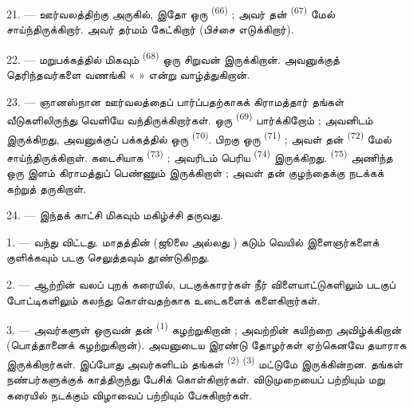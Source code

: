 21. --- ஊர்வலத்திற்கு அருகில், இதோ ஒரு 
\textsuperscript{(66)} ; அவர் தன்  \textsuperscript{(67)}
மேல் சாய்ந்திருக்கிறார். அவர் தர்மம் கேட்கிறார் (பிச்சை எடுக்கிறார்).

22. --- மறுபக்கத்தில் மிகவும்  \textsuperscript{(68)} ஒரு
சிறுவன் இருக்கிறான். அவனுக்குத் தெரிந்தவர்களை வணங்கி «  »
என்று வாழ்த்துகிறான்.

23. --- ஞானஸ்நான ஊர்வலத்தைப் பார்ப்பதற்காகக் கிராமத்தார் தங்கள்
வீடுகளிலிருந்து வெளியே வந்திருக்கிறார்கள். ஒரு 
\textsuperscript{(69)} பார்க்கிறோம் ; அவனிடம் 
இருக்கிறது, அவனுக்குப் பக்கத்தில் ஒரு 
\textsuperscript{(70)}. பிறகு ஒரு  \textsuperscript{(71)} ; அவள்
தன்  \textsuperscript{(72)} மேல் சாய்ந்திருக்கிறாள்.
கடைசியாக  \textsuperscript{(73)} ; அவரிடம் பெரிய
 \textsuperscript{(74)} இருக்கிறது.  \textsuperscript{(75)} அணிந்த ஒரு இளம் கிராமத்துப் பெண்ணும்
இருக்கிறாள் ; அவள் தன் குழந்தைக்கு நடக்கக் கற்றுத் தருகிறாள்.

24. --- இந்தக் காட்சி மிகவும் மகிழ்ச்சி தருவது.

\VUsaut{4.0mm}
\VUsaut{3.0mm}

\VUsaut{2.4mm}

\VUsaut{3.0mm}

1. ---  வந்து விட்டது.  மாதத்தின் (ஜூலை அல்லது
) கடும் வெயில் இளைஞர்களைக் குளிக்கவும் படகு
செலுத்தவும் தூண்டுகிறது.

2. --- ஆற்றின் வலப் புறக் கரையில், படகுக்காரர்கள் நீர் விளையாட்டுகளிலும்
படகுப் போட்டிகளிலும் கலந்து கொள்வதற்காக உடைகளைக் களைகிறார்கள்.

3. --- அவர்களுள் ஒருவன் தன்  \textsuperscript{(1)}
கழற்றுகிறான் ; அவற்றின் கயிற்றை அவிழ்க்கிறான் (பொத்தானைக் கழற்றுகிறான்).
அவனுடைய இரண்டு தோழர்கள் ஏற்கெனவே தயாராக இருக்கிறார்கள். இப்போது அவர்களிடம்
தங்கள்  \textsuperscript{(2)} 
\textsuperscript{(3)} மட்டுமே இருக்கின்றன. தங்கள் நண்பர்களுக்குக் காத்திருந்து
பேசிக் கொள்கிறார்கள். விடுமுறையைப் பற்றியும் மறு கரையில் நடக்கும் விழாவைப்
பற்றியும் பேசுகிறார்கள்.

